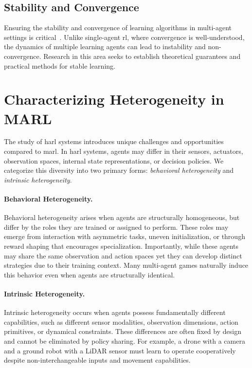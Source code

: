    \subsection*{Stability and Convergence}

Ensuring the stability and convergence of learning algorithms in 
multi-agent settings is critical~\cite{papoudakis2021}. 
Unlike single-agent \gls{rl}, where convergence is well-understood, 
the dynamics of multiple learning agents can lead to instability 
and non-convergence. Research in this area seeks to establish 
theoretical guarantees and practical methods for stable learning.


\section{Characterizing Heterogeneity in MARL}

The study of \gls{harl} systems introduces unique challenges and opportunities 
compared to \gls{marl}. 
In \gls{harl} systems, agents may differ in their sensors, actuators, 
observation spaces, internal state representations, or decision policies. 
We categorize this diversity into two primary forms: 
\emph{behavioral heterogeneity} and \emph{intrinsic heterogeneity}.

\paragraph{Behavioral Heterogeneity.}
Behavioral heterogeneity arises when agents are structurally homogeneous, 
but differ by the roles they are trained or assigned to perform. 
These roles may emerge from interaction with asymmetric tasks, uneven 
initialization, or through reward shaping that encourages specialization. 
Importantly, while these agents may share the same observation and action 
spaces yet they can develop distinct strategies due to their training context. 
Many multi-agent games naturally induce this behavior even 
when agents are structurally identical.

\paragraph{Intrinsic Heterogeneity.}
Intrinsic heterogeneity occurs when agents possess fundamentally 
different capabilities, such as different sensor modalities, 
observation dimensions, action primitives, or dynamical constraints. 
These differences are often fixed by design and cannot be eliminated 
by policy sharing. For example, a drone with a camera and a ground 
robot with a LiDAR sensor must learn to operate cooperatively despite 
non-interchangeable inputs and movement capabilities.

